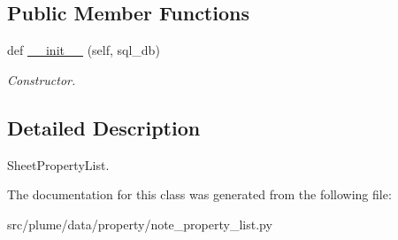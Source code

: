\subsection*{Public Member Functions}
\begin{DoxyCompactItemize}
\item 
def \hyperlink{classplume-creator_1_1src_1_1plume_1_1data_1_1property_1_1note__property__list_1_1_note_property_list_a46780c0f739f31e1b201b32e382077ee}{\+\_\+\+\_\+init\+\_\+\+\_\+} (self, sql\+\_\+db)\hypertarget{classplume-creator_1_1src_1_1plume_1_1data_1_1property_1_1note__property__list_1_1_note_property_list_a46780c0f739f31e1b201b32e382077ee}{}\label{classplume-creator_1_1src_1_1plume_1_1data_1_1property_1_1note__property__list_1_1_note_property_list_a46780c0f739f31e1b201b32e382077ee}

\begin{DoxyCompactList}\small\item\em Constructor. \end{DoxyCompactList}\end{DoxyCompactItemize}


\subsection{Detailed Description}
Sheet\+Property\+List. 

The documentation for this class was generated from the following file\+:\begin{DoxyCompactItemize}
\item 
src/plume/data/property/note\+\_\+property\+\_\+list.\+py\end{DoxyCompactItemize}
